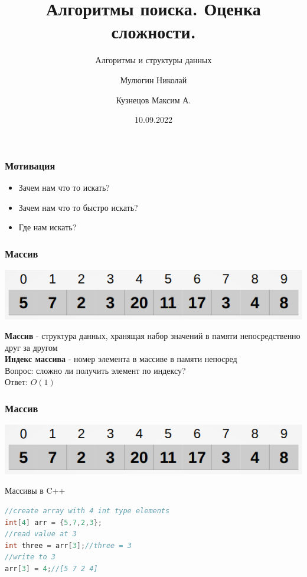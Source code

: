 \documentclass[russian, 12pt]{beamer}
\title{Алгоритмы поиска. Оценка сложности.}
\subtitle{Алгоритмы и структуры данных}
\author{
  Мулюгин Николай
  \and
  Кузнецов Максим \texorpdfstring{\thinspace}{Lg}А.
  }
\date{10.09.2022}
\begin{document}
\begin{frame}
\titlepage
\end{frame}

\begin{frame}
\frametitle{Мотивация}
  \begin{itemize}
    \item Зачем нам что то искать?\\[0.5cm]
    \pause
    \item Зачем нам что то быстро искать?\\[0.5cm]
    \pause
    \item Где нам искать?\\[0.5cm]
    

  \end{itemize}
\end{frame}
\begin{frame}
\frametitle{Массив}
\begin{center}
  \includegraphics[scale=0.5]{img/array.png}\\  
\end{center}\pause
  \textbf{Массив} - структура данных, хранящая набор значений 
  в памяти непосредственно друг за другом\\[0.3cm]\pause
  \textbf{Индекс массива} - номер элемента в массиве 
  в памяти непосред\\[0.3cm]\pause
  Вопрос: сложно ли получить элемент по индексу?\\ \pause
  Ответ: \;$O(1)$
\end{frame}
\lstset{style=mystyle}
\begin{frame}[fragile]
\frametitle{Массив}
\begin{center}
  \includegraphics[scale=0.5]{img/array.png}\\  
\end{center}
Массивы в C++
\begin{lstlisting}[language=C++]
//create array with 4 int type elements
int[4] arr = {5,7,2,3};
//read value at 3
int three = arr[3];//three = 3
//write to 3
arr[3] = 4;//[5 7 2 4]
\end{lstlisting}
\end{frame}
\end{document}
